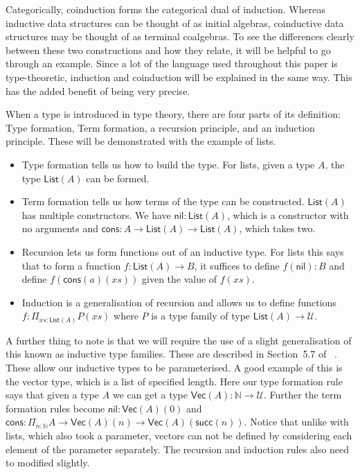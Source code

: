 \documentclass{article}
\theoremstyle{definition}
\theoremstyle{examplestyle}
\begin{document}
Categorically, coinduction forms the categorical dual of induction. Whereas inductive data structures can be thought of as initial algebras, coinductive data structures may be thought of as terminal coalgebras. To see the differences clearly between these two constructions and how they relate, it will be helpful to go through an example. Since a lot of the language used throughout this paper is type-theoretic, induction and coinduction will be explained in the same way. This has the added benefit of being very precise.

When a type is introduced in type theory, there are four parts of its definition: Type formation, Term formation, a recursion principle, and an induction principle. These will be demonstrated with the example of lists.
\begin{itemize}
\item Type formation tells us how to build the type. For lists, given a type \(A\), the type \(\mathsf{List}(A)\) can be formed.
\item Term formation tells us how terms of the type can be constructed. \(\mathsf{List}(A)\) has multiple constructors. We have \(\mathsf{nil} : \mathsf{List}(A)\), which is a constructor with no arguments and \(\mathsf{cons} : A \to \mathsf{List}(A) \to \mathsf{List}(A)\), which takes two.
\item Recursion lets us form functions out of an inductive type. For lists this says that to form a function \(f : \mathsf{List}(A) \to B\), it suffices to define \(f(\mathsf{nil}) : B\) and define \(f(\mathsf{cons}(a)(xs))\) given the value of \(f(xs)\).
\item Induction is a generalisation of recursion and allows us to define functions \(f : \Pi_{xs : \mathsf{List}(A)} P(xs)\) where \(P\) is a type family of type \(\mathsf{List}(A) \to \mathcal{U}\).
\end{itemize}

A further thing to note is that we will require the use of a slight generalisation of this known as inductive type families. These are described in Section~5.7 of ~\cite{hottbook}. These allow our inductive types to be parameterised. A good example of this is the vector type, which is a list of specified length. Here our type formation rule says that given a type \(A\) we can get a type \(\mathsf{Vec}(A) : \mathbb{N} \to \mathcal{U}\). Further the term formation rules become \(\mathsf{nil} : \mathsf{Vec}(A)(0)\) and \(\mathsf{cons} : \Pi_{n : \mathbb{N}} A \to \mathsf{Vec}(A)(n) \to \mathsf{Vec}(A)(\mathsf{succ}(n))\). Notice that unlike with lists, which also took a parameter, vectors can not be defined by considering each element of the parameter separately. The recursion and induction rules also need to modified slightly.
\end{document}
